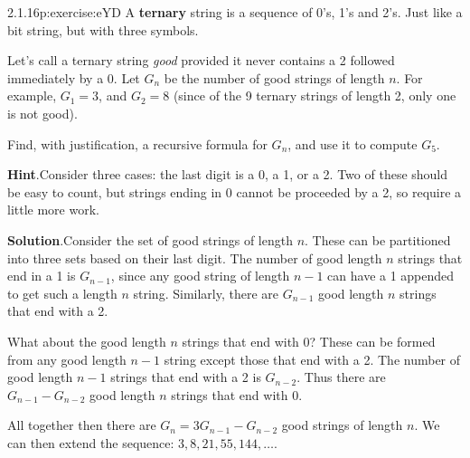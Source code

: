 \documentclass[twoside,11pt,]{book}
\newcommand{\blocktitlefont}{\relax}
\newcommand{\terminology}[1]{\textbf{#1}}
\numberwithin{equation}{chapter}
\begin{document}
\begin{divisionsolution}{2.1.16}{}{p:exercise:eYD}%
A \terminology{ternary} string is a sequence of 0's, 1's and 2's.  Just like a bit string, but with three symbols.%
\par
Let's call a ternary string \emph{good} provided it never contains a 2 followed immediately by a 0.  Let \(G_n\) be the number of good strings of length \(n\).  For example, \(G_1 = 3\), and \(G_2 = 8\) (since of the 9 ternary strings of length 2, only one is not good).%
\par
Find, with justification, a recursive formula for \(G_n\), and use it to compute \(G_5\).%
\par\smallskip%
\noindent\textbf{\blocktitlefont Hint}.\quad{}Consider three cases: the last digit is a 0, a 1, or a 2.  Two of these should be easy to count, but strings ending in 0 cannot be proceeded by a 2, so require a little more work.%
\par\smallskip%
\noindent\textbf{\blocktitlefont Solution}.\quad{}Consider the set of good strings of length \(n\).  These can be partitioned into three sets based on their last digit.  The number of good length \(n\) strings that end in a 1 is \(G_{n-1}\), since any good string of length \(n-1\) can have a 1 appended to get such a length \(n\) string.  Similarly, there are \(G_{n-1}\) good length \(n\) strings that end with a 2.%
\par
What about the good length \(n\) strings that end with 0?  These can be formed from any good length \(n-1\) string except those that end with a 2.  The number of good length \(n-1\) strings that end with a 2 is \(G_{n-2}\).  Thus there are \(G_{n-1} - G_{n-2}\) good length \(n\) strings that end with 0.%
\par
All together then there are \(G_n = 3G_{n-1} - G_{n-2}\) good strings of length \(n\).  We can then extend the sequence: \(3, 8, 21, 55, 144,\ldots\).%
\end{divisionsolution}%
\end{document}
